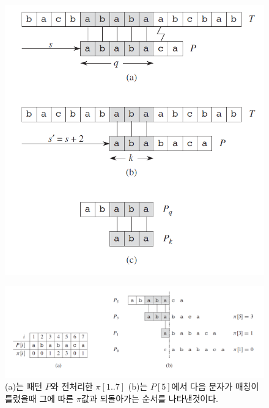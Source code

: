 \documentclass[10pt]{beamer}
\begin{document}
\begin{frame}
    \begin{figure}[h!]
        \centering
        \includegraphics[scale=0.4]{pic3.PNG}
    \end{figure}

\end{frame}


\begin{frame}
    \begin{figure}[h!]
        \centering
        \includegraphics[scale=0.3]{pic4.PNG}
        \caption{(a)는 패턴 $P$와 전처리한 $\pi[1..7]$ (b)는 $P[5]$에서 다음 문자가 매칭이 틀렸을때 그에 따른 $\pi$값과 되돌아가는 순서를 나타낸것이다.}
    \end{figure}
\end{frame}
\end{document}
